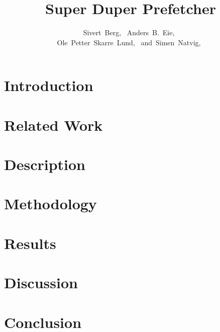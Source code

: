 \documentclass[10pt,journal]{IEEEtran}
\begin{document}
\title{Super Duper Prefetcher}

\author{
        Sivert~Berg,~
        Anders~B.~Eie,~\\
        Ole~Petter~Skarre~Lund,~
        and~Simen~Natvig,~}

\maketitle

\begin{abstract}

\end{abstract}

\section{Introduction}


\section{Related Work}


\section{Description}


\section{Methodology}


\section{Results}


\section{Discussion}


\section{Conclusion}

\end{document}
